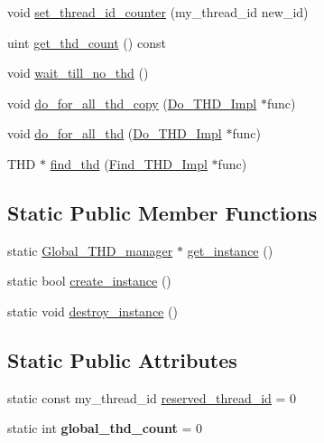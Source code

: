 \begin{DoxyCompactItemize}
\item 
void \mbox{\hyperlink{classGlobal__THD__manager_ab82aa13615fd9bf44dea89589773c61e}{set\+\_\+thread\+\_\+id\+\_\+counter}} (my\+\_\+thread\+\_\+id new\+\_\+id)
\item 
uint \mbox{\hyperlink{classGlobal__THD__manager_a1da81e89755632c72454b9570a544ad3}{get\+\_\+thd\+\_\+count}} () const
\item 
void \mbox{\hyperlink{classGlobal__THD__manager_ac52a7fd63b6042da22b9f0126e1a51eb}{wait\+\_\+till\+\_\+no\+\_\+thd}} ()
\item 
void \mbox{\hyperlink{classGlobal__THD__manager_a2d0baa41cc903006ffa2d06b1f6e56d9}{do\+\_\+for\+\_\+all\+\_\+thd\+\_\+copy}} (\mbox{\hyperlink{classDo__THD__Impl}{Do\+\_\+\+T\+H\+D\+\_\+\+Impl}} $\ast$func)
\item 
void \mbox{\hyperlink{classGlobal__THD__manager_a493a2379502fbb615bd24629f2cf85d0}{do\+\_\+for\+\_\+all\+\_\+thd}} (\mbox{\hyperlink{classDo__THD__Impl}{Do\+\_\+\+T\+H\+D\+\_\+\+Impl}} $\ast$func)
\item 
T\+HD $\ast$ \mbox{\hyperlink{classGlobal__THD__manager_ae533bd3cb655dbbdb30bfd1703110dba}{find\+\_\+thd}} (\mbox{\hyperlink{classFind__THD__Impl}{Find\+\_\+\+T\+H\+D\+\_\+\+Impl}} $\ast$func)
\end{DoxyCompactItemize}
\subsection*{Static Public Member Functions}
\begin{DoxyCompactItemize}
\item 
static \mbox{\hyperlink{classGlobal__THD__manager}{Global\+\_\+\+T\+H\+D\+\_\+manager}} $\ast$ \mbox{\hyperlink{classGlobal__THD__manager_a5e4a050bfded837c0faf11f11f83557e}{get\+\_\+instance}} ()
\item 
static bool \mbox{\hyperlink{classGlobal__THD__manager_adde98689c7a71d9adf1284d89cab8776}{create\+\_\+instance}} ()
\item 
static void \mbox{\hyperlink{classGlobal__THD__manager_aa672fe32e86b6e351276407d90957639}{destroy\+\_\+instance}} ()
\end{DoxyCompactItemize}
\subsection*{Static Public Attributes}
\begin{DoxyCompactItemize}
\item 
static const my\+\_\+thread\+\_\+id \mbox{\hyperlink{classGlobal__THD__manager_a7306fb4d252fca9c53df1b427ba3096b}{reserved\+\_\+thread\+\_\+id}} = 0
\item 
\mbox{\label{classGlobal__THD__manager_aef84bbb0aa2b15cdadbc75589074f693}} 
static int {\bfseries global\+\_\+thd\+\_\+count} = 0
\end{DoxyCompactItemize}

